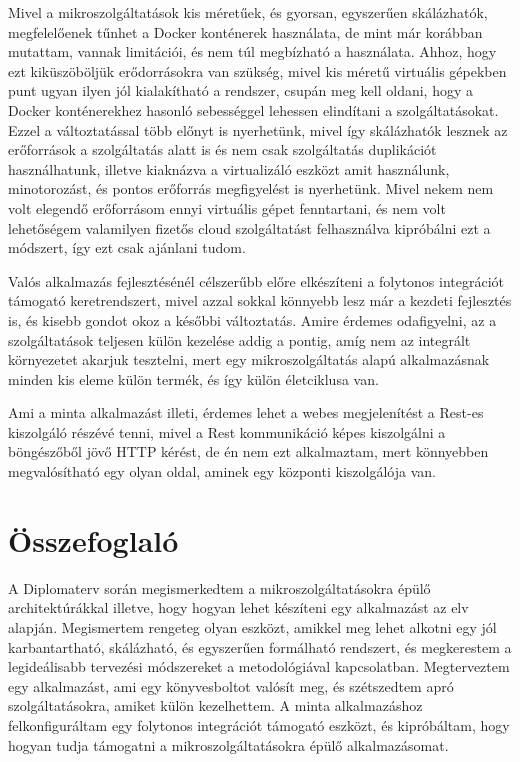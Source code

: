 \documentclass[11pt,magyar,a4paper,twoside,]{report}
\begin{document}
Mivel a mikroszolgáltatások kis méretűek, és gyorsan, egyszerűen
skálázhatók, megfelelőenek tűnhet a Docker konténerek használata, de
mint már korábban mutattam, vannak limitációi, és nem túl megbízható a
használata. Ahhoz, hogy ezt kiküszöböljük erődorrásokra van szükség,
mivel kis méretű virtuális gépekben punt ugyan ilyen jól kialakítható a
rendszer, csupán meg kell oldani, hogy a Docker konténerekhez hasonló
sebességgel lehessen elindítani a szolgáltatásokat. Ezzel a
változtatással több előnyt is nyerhetünk, mivel így skálázhatók lesznek
az erőforrások a szolgáltatás alatt is és nem csak szolgáltatás
duplikációt használhatunk, illetve kiaknázva a virtualizáló eszközt amit
használunk, minotorozást, és pontos erőforrás megfigyelést is
nyerhetünk. Mivel nekem nem volt elegendő erőforrásom ennyi virtuális
gépet fenntartani, és nem volt lehetőségem valamilyen fizetős cloud
szolgáltatást felhasználva kipróbálni ezt a módszert, így ezt csak
ajánlani tudom.

Valós alkalmazás fejlesztésénél célszerűbb előre elkészíteni a folytonos
integrációt támogató keretrendszert, mivel azzal sokkal könnyebb lesz
már a kezdeti fejlesztés is, és kisebb gondot okoz a későbbi
változtatás. Amire érdemes odafigyelni, az a szolgáltatások teljesen
külön kezelése addig a pontig, amíg nem az integrált környezetet akarjuk
tesztelni, mert egy mikroszolgáltatás alapú alkalmazásnak minden kis
eleme külön termék, és így külön életciklusa van.

Ami a minta alkalmazást illeti, érdemes lehet a webes megjelenítést a
Rest-es kiszolgáló részévé tenni, mivel a Rest kommunikáció képes
kiszolgálni a böngészőből jövő HTTP kérést, de én nem ezt alkalmaztam,
mert könnyebben megvalósítható egy olyan oldal, aminek egy központi
kiszolgálója van.

\chapter{Összefoglaló}\label{uxf6sszefoglaluxf3}

A Diplomaterv során megismerkedtem a mikroszolgáltatásokra épülő
architektúrákkal illetve, hogy hogyan lehet készíteni egy alkalmazást az
elv alapján. Megismertem rengeteg olyan eszközt, amikkel meg lehet
alkotni egy jól karbantartható, skálázható, és egyszerűen formálható
rendszert, és megkerestem a legideálisabb tervezési módszereket a
metodológiával kapcsolatban. Megterveztem egy alkalmazást, ami egy
könyvesboltot valósít meg, és szétszedtem apró szolgáltatásokra, amiket
külön kezelhettem. A minta alkalmazáshoz felkonfiguráltam egy folytonos
integrációt támogató eszközt, és kipróbáltam, hogy hogyan tudja
támogatni a mikroszolgáltatásokra épülő alkalmazásomat.
\end{document}
